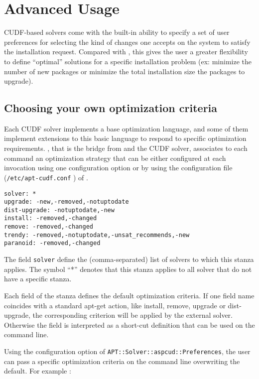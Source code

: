 \section{Advanced Usage}

CUDF-based solvers come with the built-in ability to specify a
set of user preferences for selecting the kind of changes one accepts
on the system to satisfy the installation request. Compared with
\aptget, this gives the user a greater flexibility to define
``optimal'' solutions for a specific installation problem (ex:
minimize the number of new packages or minimize the total installation
size the packages to upgrade).

\subsection{Choosing your own optimization criteria}

Each CUDF solver implements a base optimization language, and some of
them implement extensions to this basic language to respond to
specific optimization requirements. \aptcudf, that is the bridge from
\aptget{} and the CUDF solver, associates to each \aptget{} command an
optimization strategy that can be either configured at each invocation
using one \aptget{} configuration option or by using the configuration
file (\texttt{/etc/apt-cudf.conf} ) of \aptcudf.

\begin{verbatim}
solver: *
upgrade: -new,-removed,-notuptodate
dist-upgrade: -notuptodate,-new
install: -removed,-changed
remove: -removed,-changed
trendy: -removed,-notuptodate,-unsat_recommends,-new
paranoid: -removed,-changed
\end{verbatim}

The field \texttt{solver} define the (comma-separated) list of solvers
to which this stanza applies. The symbol ``*'' denotes that this
stanza applies to all solver that do not have a specific stanza.

Each field of the stanza defines the default optimization criteria.
If one field name coincides with a standard apt-get action, like
install, remove, upgrade or dist-upgrade, the corresponding criterion
will be applied by the external solver. Otherwise the field is
interpreted as a short-cut definition that can be used on the \aptget{}
command line.

Using the configuration option of \aptget{}
\texttt{APT::Solver::aspcud::Preferences}, the user can pass a
specific optimization criteria on the command line overwriting the
default. For example :


